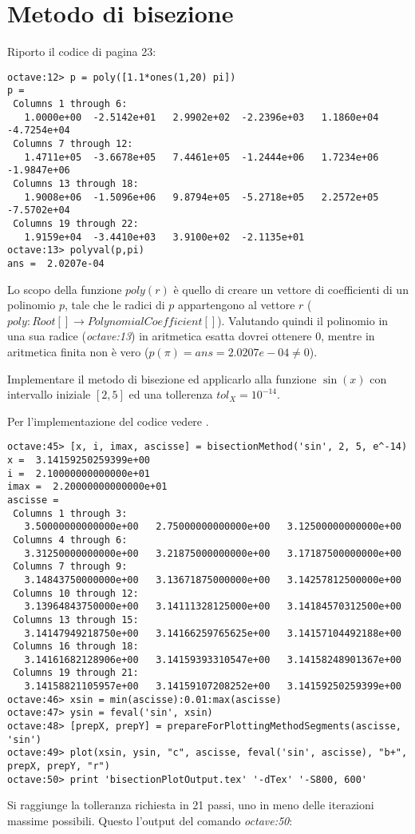 \section{Metodo di bisezione}
\label{sec:metodoDiBisezione}
Riporto il codice di pagina 23:
\begin{lstlisting}
octave:12> p = poly([1.1*ones(1,20) pi])
p =
 Columns 1 through 6:
   1.0000e+00  -2.5142e+01   2.9902e+02  -2.2396e+03   1.1860e+04  -4.7254e+04
 Columns 7 through 12:
   1.4711e+05  -3.6678e+05   7.4461e+05  -1.2444e+06   1.7234e+06  -1.9847e+06
 Columns 13 through 18:
   1.9008e+06  -1.5096e+06   9.8794e+05  -5.2718e+05   2.2572e+05  -7.5702e+04
 Columns 19 through 22:
   1.9159e+04  -3.4410e+03   3.9100e+02  -2.1135e+01
octave:13> polyval(p,pi)
ans =  2.0207e-04
\end{lstlisting}
Lo scopo della funzione $poly(r)$ \`e quello di creare un vettore di coefficienti
di un polinomio $p$, tale che le radici di $p$ appartengono al vettore $r$ 
($poly: Root[] \rightarrow PolynomialCoefficient[]$).
Valutando quindi il polinomio in una sua radice (\emph{octave:13}) in aritmetica
esatta dovrei ottenere 0, mentre in aritmetica finita non \`e vero 
($p(\pi) = ans =  2.0207e-04 \not = 0$).

\begin{exercise}
Implementare il metodo di bisezione ed applicarlo alla funzione $\sin(x)$ 
con intervallo iniziale $[2, 5]$ ed una tollerenza $tol_{X} = 10^{-14}$.
\end{exercise}
Per l'implementazione del codice vedere .
\begin{lstlisting}
octave:45> [x, i, imax, ascisse] = bisectionMethod('sin', 2, 5, e^-14)
x =  3.14159250259399e+00
i =  2.10000000000000e+01
imax =  2.20000000000000e+01
ascisse =
 Columns 1 through 3:
   3.50000000000000e+00   2.75000000000000e+00   3.12500000000000e+00
 Columns 4 through 6:
   3.31250000000000e+00   3.21875000000000e+00   3.17187500000000e+00
 Columns 7 through 9:
   3.14843750000000e+00   3.13671875000000e+00   3.14257812500000e+00
 Columns 10 through 12:
   3.13964843750000e+00   3.14111328125000e+00   3.14184570312500e+00
 Columns 13 through 15:
   3.14147949218750e+00   3.14166259765625e+00   3.14157104492188e+00
 Columns 16 through 18:
   3.14161682128906e+00   3.14159393310547e+00   3.14158248901367e+00
 Columns 19 through 21:
   3.14158821105957e+00   3.14159107208252e+00   3.14159250259399e+00
octave:46> xsin = min(ascisse):0.01:max(ascisse)
octave:47> ysin = feval('sin', xsin)
octave:48> [prepX, prepY] = prepareForPlottingMethodSegments(ascisse, 'sin')
octave:49> plot(xsin, ysin, "c", ascisse, feval('sin', ascisse), "b+", prepX, prepY, "r")
octave:50> print 'bisectionPlotOutput.tex' '-dTex' '-S800, 600'
\end{lstlisting}
Si raggiunge la tolleranza richiesta in 21 passi, uno in meno delle iterazioni
massime possibili. Questo l'output del comando \emph{octave:50}:
\begin{center}

\end{center}

